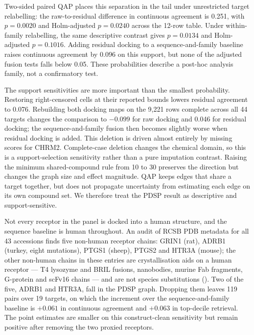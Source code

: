 Two-sided paired QAP places this separation in the tail under unrestricted target relabelling:
the raw-to-residual difference in continuous agreement is 0.251, with $p=0.0020$ and Holm-adjusted
$p=0.0240$ across the 12-row table. Under within-family relabelling, the same descriptive contrast
gives $p=0.0134$ and Holm-adjusted $p=0.1016$. Adding residual docking to a sequence-and-family
baseline raises continuous agreement by 0.096 on this support, but none of the adjusted fusion tests
falls below 0.05. These probabilities describe a post-hoc analysis family, not a confirmatory test.

The support sensitivities are more important than the smallest probability. Restoring right-censored
cells at their reported bounds lowers residual agreement to 0.076. Rebuilding both docking maps on
the 9{,}221 rows complete across all 44 targets changes the comparison to $-0.099$ for raw docking
and 0.046 for residual docking; the sequence-and-family fusion then becomes slightly worse when
residual docking is added. This deletion is driven almost entirely by missing scores for CHRM2.
Complete-case deletion changes the chemical domain, so this is a
support-selection sensitivity rather than a pure imputation contrast. Raising the minimum shared-compound
rule from 10 to 30 preserves the direction but changes the graph size and effect magnitude. QAP keeps
edges that share a target together, but does not propagate uncertainty from estimating each edge on
its own compound set. We therefore treat the PDSP result as descriptive and support-sensitive.

Not every receptor in the panel is docked into a human structure, and the sequence baseline is
human throughout. An audit of RCSB PDB metadata for all 43 accessions \cite{berman2000} finds five non-human receptor chains:
GRIN1 (rat), ADRB1 (turkey, eight mutations), PTGS1 (sheep), PTGS2 and HTR3A (mouse); the other
non-human chains in these entries are crystallisation aids on a human receptor --- T4 lysozyme
and BRIL fusions, nanobodies, murine Fab fragments, G-protein and scFv16 chains --- and are not
species substitutions
(). Two of the five, ADRB1 and
HTR3A, fall in the PDSP graph. Dropping them leaves 119 pairs over 19 targets, on which the
increment over the sequence-and-family baseline is $+0.061$ in continuous agreement
and $+0.063$ in top-decile retrieval. The point estimates are smaller on this construct-clean sensitivity but
remain positive after removing the two proxied receptors.

